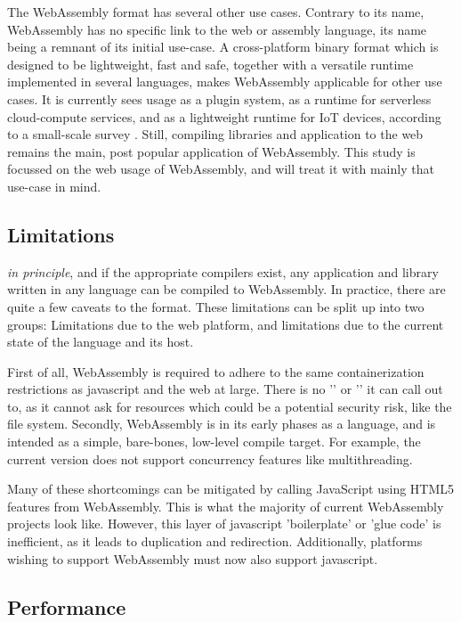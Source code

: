 The WebAssembly format has several other use cases.
Contrary to its name, WebAssembly has no specific link to the web or assembly language, its name being a remnant of its initial use-case.
A cross-platform binary format which is designed to be lightweight, fast and safe, together with a versatile runtime implemented in several languages, makes WebAssembly applicable for other use cases. 
It is currently sees usage as a plugin system, as a runtime for serverless cloud-compute services, and as a lightweight runtime for IoT devices, according to a small-scale survey \citep{eberhardt_state_2022}. 
Still, compiling libraries and application to the web remains the main, post popular application of WebAssembly. 
This study is focussed on the web usage of WebAssembly, and will treat it with mainly that use-case in mind.

\subsection*{Limitations}

\emph{in principle}, and if the appropriate compilers exist, any application and library written in any language can be compiled to WebAssembly. 
In practice, there are quite a few caveats to the format. 
These limitations can be split up into two groups: 
Limitations due to the web platform, and limitations due to the current state of the language and its host.

First of all, WebAssembly is required to adhere to the same containerization restrictions as javascript and the web at large. 
There is no '' or '' it can call out to, as it cannot ask for resources which could be a potential security risk, like the file system.
Secondly, WebAssembly is in its early phases as a language, and is intended as a simple, bare-bones, low-level compile target. 
For example, the current version does not support concurrency features like multithreading.

Many of these shortcomings can be mitigated by calling JavaScript using HTML5 features from WebAssembly. 
This is what the majority of current WebAssembly projects look like. 
However, this layer of javascript 'boilerplate' or 'glue code' is inefficient, as it leads to duplication and redirection.
Additionally, platforms wishing to support WebAssembly must now also support javascript. 

\subsection*{Performance}

